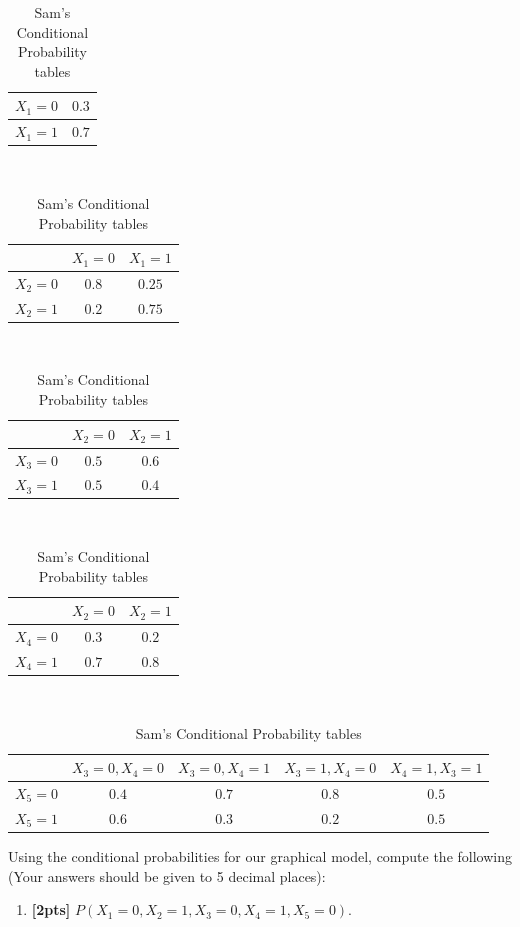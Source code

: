 \documentclass[12pt]{article}
\begin{document}
\begin{enumerate}
\begin{table}[H]
    \centering
    \begin{tabular}{|c|c|}
    \hline
         $X_1=0$ & $0.3$  \\ \hline
         $X_1=1$ & $0.7$    \\  \hline
    \end{tabular}
    \\ 
    \begin{tabular}{|c|c|c|}
    \hline
            & $X_1=0$ & $X_1=1$   \\  \hline
        $X_2=0$ & $0.8$ & $0.25$ \\  \hline
        $X_2=1$ & $0.2$  & $0.75$    \\  \hline
    \end{tabular}
    \\ 
    \begin{tabular}{|c|c|c|}
    \hline
            & $X_2=0$ & $X_2=1$   \\  \hline
        $X_3=0$ & $0.5$ & $0.6$ \\  \hline
        $X_3=1$ & $0.5$  & $0.4$    \\  \hline
    \end{tabular}
    \\ 
    \begin{tabular}{|c|c|c|}
    \hline
            & $X_2=0$ & $X_2=1$   \\  \hline
        $X_4=0$ & $0.3$ & $0.2$ \\  \hline
        $X_4=1$ & $0.7$  & $0.8$    \\  \hline
    \end{tabular}
    \\ 
    \begin{tabular}{|c|c|c|c|c|}
    \hline
            & $X_3=0, X_4=0$ & $X_3=0,X_4=1$ & $X_3=1,X_4=0$ & $X_4=1,X_3=1$   \\  \hline
        $X_5=0$ & $0.4$ & $0.7$ & $0.8$ & $0.5$ \\  \hline
        $X_5=1$ & $0.6$  & $0.3$ & $0.2$ & $0.5$    \\  \hline
    \end{tabular}
    \caption{Sam's Conditional Probability tables}
\end{table}

Using the conditional probabilities for our graphical model, compute the following (Your answers should be given to 5 decimal places): 
\begin{enumerate}
\item \textbf{[2pts]} $P(X_1=0, X_2=1, X_3=0, X_4=1, X_5=0)$. 



\end{enumerate}
\end{enumerate}
\end{document}
